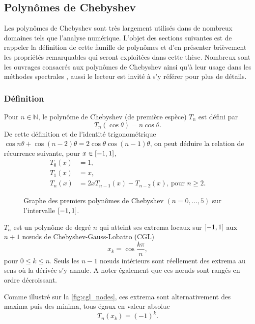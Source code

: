 \subsection{Polynômes de Chebyshev}
Les polynômes de Chebyshev sont très largement utilisés dans de nombreux domaines tels que l'analyse numérique.
L'objet des sections suivantes est de rappeler la définition de cette famille 
de polynômes et d'en présenter brièvement les propriétés remarquables qui seront exploitées dans cette thèse. 
Nombreux sont les ouvrages consacrés aux polynômes de Chebyshev \cite{mason2002, gil2007} ainsi qu'à leur usage dans les méthodes spectrales \cite{boyd2001, canuto2006}, aussi le lecteur est invité à s'y référer pour plus de détails.


\subsubsection{Définition}
Pour $n \in \mathbb{N}$, le polynôme de Chebyshev (de première espèce) $T_n$ est défini par%
\begin{equation}
	T_n(\cos \theta) = n \cos \theta.
	\label{eq:chebyshev_trigo}
\end{equation}
De cette définition et de l'identité trigonométrique $\cos n\theta + \cos (n-2)\theta = 2\cos \theta \cos (n-1)\theta$, on peut déduire la relation de récurrence suivante, pour $x \in \left[ -1, 1 \right]$, 
\begin{align}
	T_0(x) &= 1, \nonumber\\
	T_1(x) &= x, \nonumber\\
	T_n(x) &= 2x T_{n-1}(x) - T_{n-2}(x) \text{,\ pour\ } n \geq 2.
	\label{eq:chebyshev_recurrence}
\end{align}


\begin{figure}
	\centering
	
	\caption{Graphe des premiers polynômes de Chebyshev $(n=0,\ldots,5)$ sur l'intervalle $\left[ -1, 1 \right]$.}
	\label{fig:chebyshev_polynomials}
\end{figure}


$T_n$ est un polynôme de degré $n$ %
qui atteint ses extrema locaux sur $\left[ -1, 1 \right]$ aux $n+1$ n\oe uds de Chebyshev-Gauss-Lobatto (CGL)%
\begin{equation}
	x_k = \cos \frac{k \pi}{n},
	\label{eq:cgl_nodes}
\end{equation}
pour $0 \leq k \leq n$. 
Seuls les $n-1$ n\oe uds intérieurs sont réellement des extrema au sens où la dérivée s'y annule. 
A noter également que ces n\oe uds sont rangés en ordre décroissant.\par
Comme illustré sur la \autoref{fig:cgl_nodes}, ces extrema sont alternativement des maxima puis des minima, tous égaux en valeur absolue
\begin{equation}
	T_n(x_k) = (-1)^{k}.
	\label{eq:chebyshev_equioscillation}
\end{equation}

